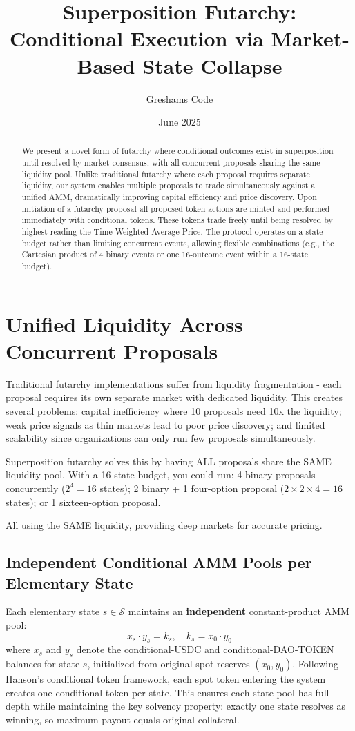 \documentclass{article}
\title{Superposition Futarchy: Conditional Execution via Market-Based State Collapse}
\author[1]{Greshams Code}
\affil[1]{Founder, \href{https://govex.ai}{Govex.ai}}
\date{June 2025}
\begin{document}
\maketitle

\begin{abstract}
    We present a novel form of futarchy where conditional outcomes exist in superposition until resolved by market consensus, with all concurrent 
    proposals sharing the same liquidity pool. Unlike traditional futarchy 
    where each proposal requires separate liquidity, our system enables 
    multiple proposals to trade simultaneously against a unified AMM, 
    dramatically improving capital efficiency and price discovery. Upon initiation of a futarchy proposal all proposed token actions are minted and performed immediately with conditional tokens. These tokens trade freely until being resolved by highest reading the Time-Weighted-Average-Price.
    The protocol operates on a state budget rather than limiting concurrent events, allowing flexible combinations (e.g., the Cartesian product of 4 binary events or one 16-outcome event within a 16-state budget).
    \end{abstract}
    
\section{Unified Liquidity Across Concurrent Proposals}

Traditional futarchy implementations suffer from liquidity fragmentation - 
each proposal requires its own separate market with dedicated liquidity. 
This creates several problems: capital inefficiency where 10 proposals need 10x the liquidity; weak price signals as thin markets lead to poor price discovery; and limited scalability since organizations can only run few proposals simultaneously.

Superposition futarchy solves this by having ALL proposals share the SAME liquidity pool. With a 16-state budget, you could run: 4 binary proposals concurrently ($2^4 = 16$ states); 2 binary + 1 four-option proposal ($2 \times 2 \times 4 = 16$ states); or 1 sixteen-option proposal.

All using the SAME liquidity, providing deep markets for accurate pricing.

\subsection{Independent Conditional AMM Pools per Elementary State}
Each elementary state $s \in \mathcal{S}$ maintains an \textbf{independent} constant-product AMM pool:
\begin{equation}
x_s \cdot y_s = k_s, \quad k_s = x_0 \cdot y_0
\end{equation}
where $x_s$ and $y_s$ denote the conditional-USDC and conditional-DAO-TOKEN balances for state $s$, initialized from original spot reserves $(x_0, y_0)$. Following Hanson's conditional token framework, each spot token entering the system creates one conditional token per state. This ensures each state pool has full depth while maintaining the key solvency property: exactly one state resolves as winning, so maximum payout equals original collateral.
\end{document}
